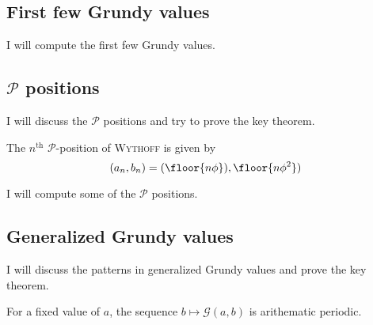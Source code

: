 \documentclass[11pt,twoside]{scrartcl}
\begin{document}
\subsection{First few Grundy values}
I will compute the first few Grundy values.

\subsection{$\mathscr{P}$ positions}
I will discuss the $\mathscr{P}$ positions and try to prove the key theorem.
\begin{theorem}
    The $n^{\text{th}}$ $\mathscr{P}$-position of \textsc{Wythoff} is given by
    \[(a_n,b_n) = (\floor{n\phi}), \floor{n\phi^2})\] 
\end{theorem}

I will compute some of the $\mathscr{P}$ positions.

\subsection{Generalized Grundy values}
I will discuss the patterns in generalized Grundy values and prove the key theorem.
\begin{theorem}
    For a fixed value of $a$, the sequence $b \mapsto \mathscr{G}(a,b)$ is arithematic periodic.
\end{theorem}
\end{document}
